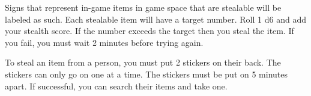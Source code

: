 \documentclass[green]{LRSguildcamp1}
\begin{document}
\name{\gStealing{}}

Signs that represent in-game items in game space that are stealable will be labeled as such. Each stealable item will have a target number. Roll 1 d6 and add your stealth score.  If the number exceeds the target then you steal the item. If you fail, you must wait 2 minutes before trying again.

To steal an item from a person, you must put 2 stickers on their back. The stickers can only go on one at a time. The stickers must be put on 5 minutes apart. If successful, you can search their items and take one.
\end{document}
